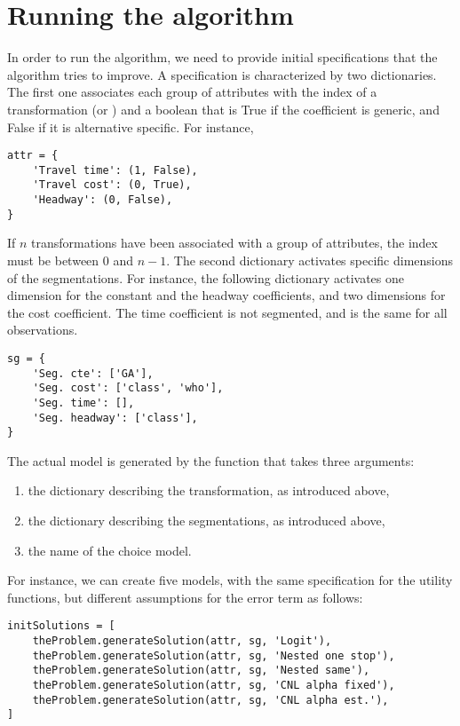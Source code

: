 \documentclass[12pt,a4paper]{article}
\begin{document}
\section{Running the algorithm}

In order to run the algorithm, we need to provide initial
specifications that the algorithm tries to improve. A
specification is characterized by two dictionaries. The first one
associates each group of attributes with the index of a transformation (or
\lstinline@None@) and a boolean that is True if the coefficient is
generic, and False if it is alternative specific.
For instance,
\begin{lstlisting}
attr = {
    'Travel time': (1, False),
    'Travel cost': (0, True),
    'Headway': (0, False),
}
\end{lstlisting}
If $n$ transformations have been associated with a group of
attributes, the index must be between $0$ and $n-1$.
The second dictionary activates specific dimensions of the
segmentations. For instance, the following dictionary
activates one dimension for the constant  and the
headway coefficients, and two dimensions for the cost coefficient.
The time coefficient is not segmented, and is the same for all observations.
\begin{lstlisting}
sg = {
    'Seg. cte': ['GA'],
    'Seg. cost': ['class', 'who'],
    'Seg. time': [],
    'Seg. headway': ['class'],
}
\end{lstlisting}
The actual model is generated by the function
\lstinline@generateSolution@ that takes three arguments:
\begin{enumerate}
\item the dictionary describing the transformation, as introduced above,
\item the dictionary describing the segmentations, as introduced
  above,
\item the name of the choice model.
\end{enumerate}
For instance, we can create five models, with the same specification
for the utility functions, but different assumptions for the error
term as follows:
\begin{lstlisting}
initSolutions = [
    theProblem.generateSolution(attr, sg, 'Logit'),
    theProblem.generateSolution(attr, sg, 'Nested one stop'),
    theProblem.generateSolution(attr, sg, 'Nested same'),
    theProblem.generateSolution(attr, sg, 'CNL alpha fixed'),
    theProblem.generateSolution(attr, sg, 'CNL alpha est.'),
]
\end{lstlisting}
\end{document}
